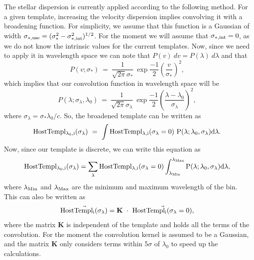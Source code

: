 \documentclass[12pt,letterpaper]{article}
\begin{document}
The stellar dispersion is currently applied according to the following
method. For a given template, increasing the velocity dispersion
implies convolving it with a broadening function. For simplicity, we
assume that this function is a Gaussian of width $\sigma_{*,\rm use} =
(\sigma_*^2 - \sigma_{*,\rm int}^2)^{1/2}$. For the moment we will
assume that $\sigma_{*,\rm int} = 0$, as we do not know the intrinsic
values for the current templates. Now, since we need to apply it in
wavelength space we can note that $P(v)\ dv = P(\lambda)\ d\lambda$
and that
\begin{equation}
  P(v;\sigma_*)\ =\ \frac{1}{\sqrt{2\pi}\sigma_*}\ \exp{\frac{-1}{2}\left(\frac{v}{\sigma_*}\right)^2},
\end{equation}
\noindent which implies that our convolution function in wavelength
space will be
\begin{equation}
  P(\lambda;\sigma_{\lambda},\lambda_0)\ =\ \frac{1}{\sqrt{2\pi}\sigma_{\lambda}}\ \exp{\frac{-1}{2}\left(\frac{\lambda-\lambda_0}{\sigma_{\lambda}}\right)^2},
\end{equation}
\noindent where $\sigma_{\lambda} = \sigma_* \lambda_0/c$. So, the
broadened template can be written as
\begin{equation}
  \rm HostTempl_{\lambda_0,i}(\sigma_{\lambda})\ =\ \int \rm HostTempl_{\lambda,i}(\sigma_{\lambda}=0)\ P(\lambda;\lambda_0,\sigma_{\lambda}) d\lambda.
\end{equation}
Now, since our template is discrete, we can write this equation as
\begin{equation}
  \rm HostTempl_{\lambda_0,i}(\sigma_{\lambda}) =  \sum_{\lambda} \rm HostTempl_{\lambda,i}(\sigma_{\lambda}=0) \int_{\lambda_{\rm Min}}^{\lambda_{\rm Max}} P(\lambda;\lambda_0,\sigma_{\lambda}) d\lambda,
\end{equation}
\noindent where $\lambda_{\rm Min}$ and $\lambda_{\rm Max}$ are the minimum and maximum wavelength of the bin. This can also be written as 
\begin{equation}
   \vec{\rm HostTempl_{i}(\sigma_{\lambda})} = \mathbf{K}\ \cdot\ \vec{\rm HostTempl_{i}(\sigma_{\lambda}=0)},
\end{equation}
\noindent where the matrix $\mathbf{K}$ is independent of the template
and holds all the terms of the convolution. For the moment the
convolution kernel is assumed to be a Gaussian, and the matrix
$\mathbf{K}$ only considers terms within 5$\sigma$ of $\lambda_0$ to
speed up the calculations.
\end{document}
